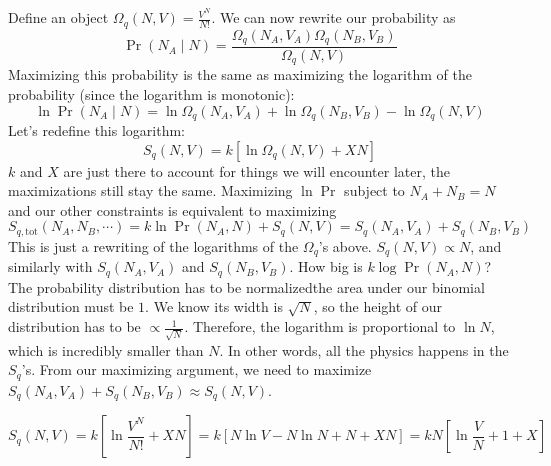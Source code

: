 \documentclass[a4paper,twoside,master.tex]{subfiles}
\begin{document}
Define an object $ \Omega_q(N, V) = \frac{V^N}{N!} $. We can now rewrite our probability as
\begin{equation}
    \Pr(N_A\mid N) = \frac{\Omega_q(N_A, V_A) \Omega_q(N_B, V_B)}{\Omega_q(N, V)}
\end{equation}
Maximizing this probability is the same as maximizing the logarithm of the probability (since the logarithm is monotonic):
\begin{equation}
    \ln{\Pr(N_A\mid N)} = \ln{\Omega_q(N_A,V_A)} + \ln{\Omega_q(N_B,V_B)} - \ln{\Omega_q(N,V)}
\end{equation}
Let's redefine this logarithm:
\begin{equation}
    S_q(N,V) = k [\ln{\Omega_q(N,V) } + XN]
\end{equation}
$ k $ and $ X $ are just there to account for things we will encounter later, the maximizations still stay the same. Maximizing $ \ln{\Pr} $ subject to $ N_A + N_B = N $ and our other constraints is equivalent to maximizing
\begin{equation}
    S_{q,\text{tot}}(N_A, N_B,\cdots) = k \ln{\Pr(N_A,N)} + S_q(N,V) = S_q(N_A, V_A) + S_q(N_B, V_B)
\end{equation}
This is just a rewriting of the logarithms of the $ \Omega_q $'s above. $ S_q(N, V) \propto N $, and similarly with $ S_q(N_A,V_A) $ and $ S_q(N_B,V_B) $. How big is $ k \log{\Pr(N_A,N)} $? The probability distribution has to be normalized\textemdash the area under our binomial distribution must be $ 1 $. We know its width is $ \sqrt{N} $, so the height of our distribution has to be $ \propto \frac{1}{\sqrt{N}} $. Therefore, the logarithm is proportional to $ \ln{N} $, which is incredibly smaller than $ N $. In other words, all the physics happens in the $ S_q $'s. From our maximizing argument, we need to maximize $ S_q(N_A,V_A) + S_q(N_B, V_B) \approx S_q(N,V) $.

\begin{equation}
    S_q(N,V) = k\left[ \ln{\frac{V^N}{N!}} + XN \right] = k\left[ N \ln{V} - N \ln{N} + N + XN \right] = kN\left[ \ln{\frac{V}{N}} + 1 + X \right]
\end{equation}
\end{document}
